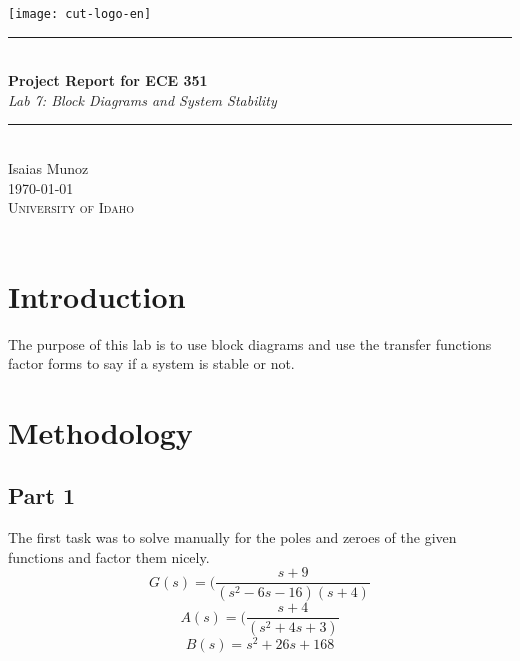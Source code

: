 \documentclass[12pt,a4paper]{article}
\newcommand{\HRule}{\rule{\linewidth}{0.5mm}}
\begin{document}
\begin{titlepage}
\begin{center}
\texttt{[image: cut-logo-en]}~\\[2cm]
\HRule \\[0.4cm]
{ \LARGE 
  \textbf{Project Report for ECE 351}\\[0.4cm]
  \emph{Lab 7: Block Diagrams and System Stability}\\[0.4cm]
}
\HRule \\[1.5cm]
{ \large
  Isaias Munoz  \\[0.1cm]
  \today\\[0.1cm]
}
\vfill
\textsc{\Large University of Idaho}\\
\\
 
\end{center}
\end{titlepage}
\newpage
\tableofcontents
{}
\newpage
\setcounter{page}{1}
\section{Introduction}\label{sec:intro}

The purpose of this lab is to use block diagrams and use the transfer functions factor forms to say if a system is stable or not. 





\section{Methodology}\label{sec:meth}
\subsection{Part 1}
The first task was to solve manually for the poles and zeroes of the given functions and factor them nicely.
\[G(s) = (\frac{s+9}{(s^2-6s-16)(s+4)} \]
\[A(s) = (\frac{s+4}{(s^2+4s+3)} \]
\[B(s) = s^2+26s+168 \]
\end{document}
